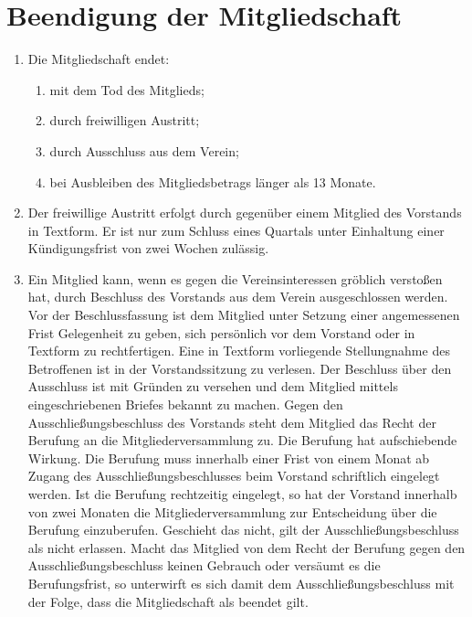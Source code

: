 \documentclass[a4paper,DIV10,12pt,headsepline]{scrartcl}
\begin{document}
\section{Beendigung der Mitgliedschaft}
\begin{enumerate}
	\item Die Mitgliedschaft endet:
	\begin{enumerate}
		\item mit dem Tod des Mitglieds;
		\item durch freiwilligen Austritt;
		\item durch Ausschluss aus dem Verein;
		\item bei Ausbleiben des Mitgliedsbetrags länger als 13 Monate.
	\end{enumerate}
	\item Der freiwillige Austritt erfolgt durch gegenüber einem Mitglied des Vorstands in Textform. Er ist nur zum Schluss eines Quartals unter Einhaltung einer Kündigungsfrist von zwei Wochen zulässig.
	\item Ein Mitglied kann, wenn es gegen die Vereinsinteressen gröblich verstoßen hat, durch Beschluss des Vorstands aus dem Verein ausgeschlossen werden. Vor der Beschlussfassung ist dem Mitglied unter Setzung einer angemessenen Frist Gelegenheit zu geben, sich persönlich vor dem Vorstand oder in Textform zu rechtfertigen. Eine in Textform vorliegende Stellungnahme des Betroffenen ist in der Vorstandssitzung zu verlesen. Der Beschluss über den Ausschluss ist mit Gründen zu versehen und dem Mitglied mittels eingeschriebenen Briefes bekannt zu machen. Gegen den Ausschließungsbeschluss des Vorstands steht dem Mitglied das Recht der Berufung an die Mitgliederversammlung zu. Die Berufung hat aufschiebende Wirkung. Die Berufung muss innerhalb einer Frist von einem Monat ab Zugang des Ausschließungsbeschlusses beim Vorstand schriftlich eingelegt werden. Ist die Berufung rechtzeitig eingelegt, so hat der Vorstand innerhalb von zwei Monaten die Mitgliederversammlung zur Entscheidung über die Berufung einzuberufen. Geschieht das nicht, gilt der Ausschließungsbeschluss als nicht erlassen. Macht das Mitglied von dem Recht der Berufung gegen den Ausschließungsbeschluss keinen Gebrauch oder versäumt es die Berufungsfrist, so unterwirft es sich damit dem Ausschließungsbeschluss mit der Folge, dass die Mitgliedschaft als beendet gilt.
\end{enumerate}
\end{document}
